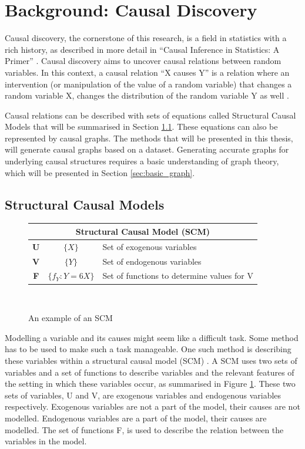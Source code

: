 \documentclass[a4paper,pdf]{article}
\begin{document}
\newpage
\section{Background: Causal Discovery}
Causal discovery, the cornerstone of this research, is a field in statistics with a rich history, as described in more detail in ``Causal Inference in Statistics: A Primer''  \cite{pearlprimer}. Causal discovery aims to uncover causal relations between random variables. In this context, a causal relation ``X causes Y'' is a relation where an intervention (or manipulation of the value of a random variable) that changes a random variable X, changes the distribution of the random variable Y as well \cite[p.~5]{pearlprimer}. 

Causal relations can be described with sets of equations called Structural Causal Models that will be summarised in Section \ref{sec:scm}. These equations can also be represented by causal graphs. The methods that will be presented in this thesis, will generate causal graphs based on a dataset.
Generating accurate graphs for underlying causal structures requires a basic understanding of graph theory, which will be presented in Section \ref{sec:basic_graph}. 

\subsection{Structural Causal Models}\label{sec:scm}
\begin{figure}[!ht]
    \centering
    \renewcommand{\arraystretch}{2}
    \setlength{\tabcolsep}{7pt}
    \begin{tabular}{|c|c|l|}
        \multicolumn{3}{c}{\large{\textbf{Structural Causal Model (SCM)}}}\\
        \hline
        \textbf{U}&$\{X\}$&Set of exogenous variables\\ \hline
        \textbf{V}&$\{Y \}$&Set of endogenous variables\\ \hline
        \textbf{F}&$\{f_Y: Y = 6X \}$&Set of functions to determine values for V\\
        \hline
    \end{tabular}\\
    \caption{An example of an SCM \label{fig:sub1}}
\end{figure} 
Modelling a variable and its causes might seem like a difficult task. Some method has to be used to make such a task manageable. One such method is describing these variables within a structural causal model (SCM) \cite[p.~26]{pearlprimer}. A SCM uses two sets of variables and a set of functions to describe variables and the relevant features of the setting in which these variables occur, as summarised in Figure \ref{fig:sub1}. These two sets of variables, U and V, are exogenous variables and endogenous variables respectively. Exogenous variables are not a part of the model, their causes are not modelled. Endogenous variables are a part of the model, their causes are modelled. The set of functions F, is used to describe the relation between the variables in the model.
 
\end{document}
